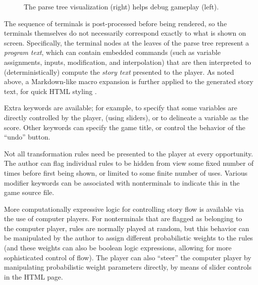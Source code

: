 \documentclass{acm_proc_article-sp}
\begin{document}
\begin{figure}
\caption{
\label{fig:tree}
The parse tree visualization (right) helps debug gameplay (left).
}
\end{figure}

The sequence of terminals is post-processed before being rendered,
so the terminals themselves do not necessarily correspond exactly to what is shown on screen.
Specifically, the terminal nodes at the leaves of the parse tree represent a {\em program text},
which can contain embedded commands (such as variable assignments, inputs, modification, and interpolation)
that are then interpreted to (deterministically) compute the {\em story text} presented to the player.
As noted above, a Markdown-like macro expansion is further applied to the generated story text,
for quick HTML styling \cite{Markdown}.

Extra keywords are available; for example, to specify that some variables are directly controlled by the player,
(using sliders), or to delineate a variable as the score.
Other keywords can specify the game title, or control the behavior of the ``undo'' button.

Not all transformation rules need be presented to the player at every opportunity.
The author can flag individual rules to be hidden from view some fixed number of times
before first being shown, or limited to some finite number of uses.
Various modifier keywords can be associated with nonterminals to indicate this in the game source file.

More computationally expressive logic for controlling story flow is available via the use of computer players.
For nonterminals that are flagged as belonging to the computer player,
rules are normally played at random,
but this behavior can be manipulated by the author to
assign different probabilistic weights to the rules
(and these weights can also be boolean logic expressions, allowing for more sophisticated control of flow).
The player can also ``steer'' the computer player by manipulating probabilistic weight parameters directly,
by means of slider controls in the HTML page.
\end{document}
